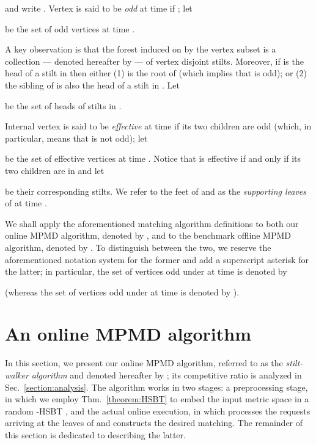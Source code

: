 \documentclass[11pt]{article}
\theoremstyle{definition}
\theoremstyle{plain}
\theoremstyle{definition}
\theoremstyle{plain}
\theoremstyle{definition}
\theoremstyle{plain}
\newcommand{\NotationLabel}[1]{\label{notationTable:#1}\ignorespaces}
\newcommand{\Sect}{Sec.}
\newcommand{\Thm}{Thm.}
\begin{document}
\NotationLabel{alg:active}
and write
.
\NotationLabel{alg:active-root}
Vertex  is said to be \emph{odd} at time  if
;
let

\NotationLabel{alg:odd}
be the set of odd vertices at time .

A key observation is that the forest induced on  by the vertex subset
 is a collection --- denoted hereafter by  ---
\NotationLabel{alg:stilts}
of vertex disjoint stilts.
Moreover, if  is the head of a stilt in  then either
(1)  is the root of  (which implies that  is odd); or
(2) the sibling of  is also the head of a stilt in .
Let

\NotationLabel{alg:heads}
be the set of heads of stilts in .

Internal vertex  is said to be \emph{effective} at time 
if its two children are odd (which, in particular, means that  is not odd);
let

\NotationLabel{alg:effective}
be the set of effective vertices at time .
Notice that  is effective if and only if its two children are in
 and let

be their corresponding stilts.
We refer to the feet of  and  as the
\emph{supporting leaves} of  at time .

We shall apply the aforementioned matching algorithm definitions to both our
online MPMD algorithm, denoted by , and to the benchmark offline MPMD
algorithm, denoted by .
To distinguish between the two, we reserve the
aforementioned notation system for the former and add a superscript asterisk
for the latter;
in particular, the set of vertices odd under  at time  is denoted
by

\NotationLabel{alg:adv-odd}
(whereas the set of vertices odd under  at time  is denoted by
).

\section{An online MPMD algorithm}
\label{section:algorithm}
In this section, we present our online MPMD algorithm, referred to as the
\emph{stilt-walker algorithm} and denoted hereafter by ;
its competitive ratio is analyzed in \Sect{}~\ref{section:analysis}.
The algorithm works in two stages:
a preprocessing stage, in which we employ \Thm{}~\ref{theorem:HSBT} to embed
the input metric space in a random -HSBT ,
and the actual online execution, in which  processes the requests arriving
at the leaves of  and constructs the desired matching.
The remainder of this section is dedicated to describing the latter.
\end{document}
